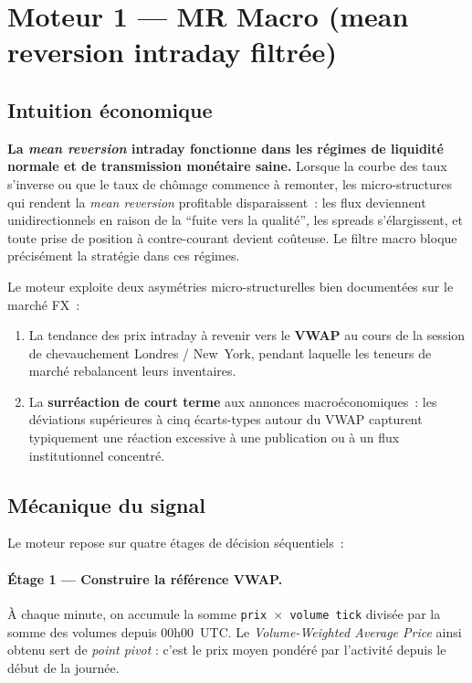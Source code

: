 \documentclass[11pt, a4paper]{scrartcl}
\begin{document}
\section{Moteur 1 --- MR Macro (mean reversion intraday filtrée)}
\label{sec:mr_macro}

\subsection{Intuition économique}

\begin{thesisbox}
\textbf{La \emph{mean reversion} intraday fonctionne dans les régimes de
liquidité normale et de transmission monétaire saine.} Lorsque la courbe des
taux s'inverse ou que le taux de chômage commence à remonter, les
micro-structures qui rendent la \emph{mean reversion} profitable disparaissent~:
les flux deviennent unidirectionnels en raison de la \enquote{fuite vers la qualité},
les spreads s'élargissent, et toute prise de position à contre-courant devient
coûteuse. Le filtre macro bloque précisément la stratégie dans ces régimes.
\end{thesisbox}

Le moteur exploite deux asymétries micro-structurelles bien documentées sur le marché FX~:

\begin{enumerate}
\item La tendance des prix intraday à revenir vers le \textbf{VWAP} au cours de la session de chevauchement Londres / New~York, pendant laquelle les teneurs de marché rebalancent leurs inventaires.
\item La \textbf{surréaction de court terme} aux annonces macroéconomiques~: les déviations supérieures à cinq écarts-types autour du VWAP capturent typiquement une réaction excessive à une publication ou à un flux institutionnel concentré.
\end{enumerate}

\subsection{Mécanique du signal}

Le moteur repose sur quatre étages de décision séquentiels~:

\paragraph{Étage 1 --- Construire la référence VWAP.}
À chaque minute, on accumule la somme \texttt{prix~$\times$~volume~tick} divisée par la somme des volumes depuis 00h00~UTC. Le \emph{Volume-Weighted Average Price} ainsi obtenu sert de \emph{point pivot} : c'est le prix moyen pondéré par l'activité depuis le début de la journée.
\end{document}
